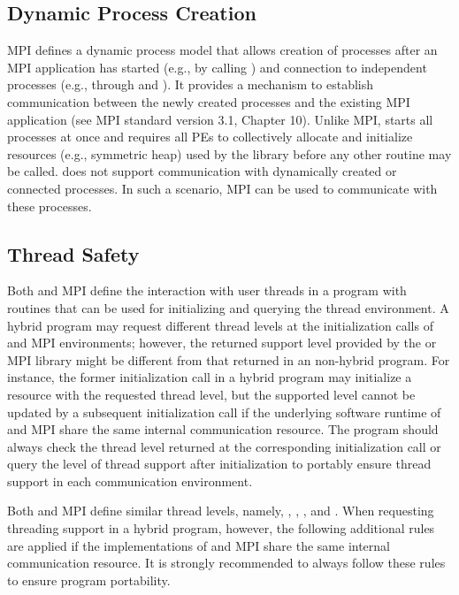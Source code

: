 \subsection{Dynamic Process Creation}
\label{subsec:interoperability:mpmd}

MPI defines a dynamic process model that allows creation of processes after
an MPI application has started (e.g., by calling ) and
connection to independent processes (e.g., through 
and ).
It provides a mechanism to establish communication
between the newly created processes and the existing MPI application (see
MPI standard version 3.1, Chapter 10).
Unlike MPI, \openshmem starts all processes at once and requires all \acp{PE} to
collectively allocate and initialize resources (e.g., symmetric heap) used by
the \openshmem library before any other \openshmem routine may
be called. \openshmem does not support communication with dynamically created
or connected processes. In such a scenario, MPI can be used to communicate
with these processes.


\subsection{Thread Safety}
\label{subsec:interoperability:thread}
Both \openshmem and MPI define the interaction with user threads in a program
with routines that can be used for initializing and querying the thread
environment. A hybrid program may request different thread levels
at the initialization calls of \openshmem and MPI environments; however, the
returned support level provided by the \openshmem or MPI library might be different
from that returned in an non-hybrid program. For instance, the former
initialization call in a hybrid program may initialize a resource with the
requested thread level, but the supported level cannot be updated by a subsequent
initialization call if the underlying software runtime of \openshmem and MPI
share the same internal communication resource.
The program should always check the  thread level returned
at the corresponding initialization call or query the level of thread support
after initialization to portably ensure thread support in each communication
environment.

Both \openshmem and MPI define similar thread levels, namely, ,
, , and .
When requesting threading support in a hybrid program, however,
the following additional rules are applied if the implementations of \openshmem
and MPI share the same internal communication resource.
It is strongly recommended to always follow these rules to ensure program
portability.

